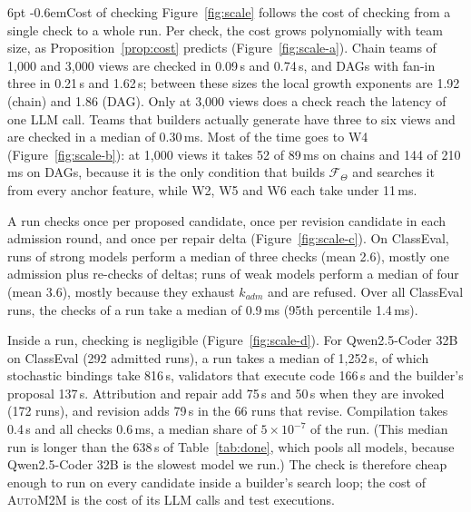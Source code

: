 \documentclass[pdflatex,sn-mathphys-num]{sn-jnl}
\makeatletter
\theoremstyle{thmstyleone}%
\theoremstyle{thmstyletwo}%
\theoremstyle{thmstylethree}%
\newcommand{\auto}{\textsc{AutoM2M}}
\newcommand{\Team}{\Theta}
\newcommand{\W}[1]{\textsf{W#1}}
\renewcommand\paragraph{\@startsection{paragraph}{4}{\z@}%
  {6pt \@plus 2pt \@minus 1pt}{-0.6em}{\normalfont\normalsize\bfseries}}
\makeatother
\begin{document}
\paragraph{Cost of checking} Figure~\ref{fig:scale} follows the cost of
checking from a single check to a whole run. Per check, the cost grows
polynomially with team size, as Proposition~\ref{prop:cost} predicts
(Figure~\ref{fig:scale-a}). Chain teams of 1{,}000 and 3{,}000 views are checked
in 0.09\,s and 0.74\,s, and DAGs with fan-in three in 0.21\,s and 1.62\,s;
between these sizes the local growth exponents are 1.92 (chain) and 1.86 (DAG).
Only at 3{,}000 views does a check reach the latency of one LLM call. Teams that
builders actually generate have three to six views and are checked in a median
of 0.30\,ms. Most of the time goes to \W{4} (Figure~\ref{fig:scale-b}): at
1{,}000 views it takes 52 of 89\,ms on chains and 144 of 210\,ms on DAGs,
because it is the only condition that builds $\mathcal{F}_\Team$ and searches it
from every anchor feature, while \W{2}, \W{5} and \W{6} each take under 11\,ms.

A run checks once per proposed candidate, once per revision candidate in each
admission round, and once per repair delta (Figure~\ref{fig:scale-c}). On
ClassEval, runs of strong models perform a median of three checks (mean 2.6),
mostly one admission plus re-checks of deltas; runs of weak models perform a
median of four (mean 3.6), mostly because they exhaust $k_{\mathit{adm}}$ and
are refused. Over all ClassEval runs, the checks of a run take a median of
0.9\,ms (95th percentile 1.4\,ms).

Inside a run, checking is negligible (Figure~\ref{fig:scale-d}). For
Qwen2.5-Coder 32B on ClassEval (292 admitted runs), a run takes a median of
1{,}252\,s, of which stochastic bindings take 816\,s, validators that execute
code 166\,s and the builder's proposal 137\,s. Attribution and repair add 75\,s
and 50\,s when they are invoked (172 runs), and revision adds 79\,s in the 66
runs that revise. Compilation takes 0.4\,s and all checks 0.6\,ms, a median
share of $5\times10^{-7}$ of the run. (This median run is longer than the
638\,s of Table~\ref{tab:done}, which pools all models, because Qwen2.5-Coder
32B is the slowest model we run.) The check is therefore cheap enough to run on
every candidate inside a builder's search loop; the cost of \auto{} is the cost
of its LLM calls and test executions.
\end{document}
